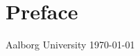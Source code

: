 \chapter*{Preface}
\raggedright \hfill Aalborg University \today

\begin{members}
    \member
        {\memberA}
        {\mailA}
    \member
        {\memberB}
        {\mailB}
    \member
        {\memberC}
        {\mailC}
    \member
        {\memberD}
        {\mailD}
    \member
        {\memberE}
        {\mailE}
    \member
        {\memberF}
        {\mailF}
    \member
        {\memberG}
        {\mailG}
\end{members}


